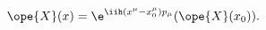 \begin{equation}	\label{12.120}
\ope{X}(x)
=
\e^{ \iih(x^\mu-x_0^\mu)p_\mu } (\ope{X}(x_0)).
	\end{equation}

